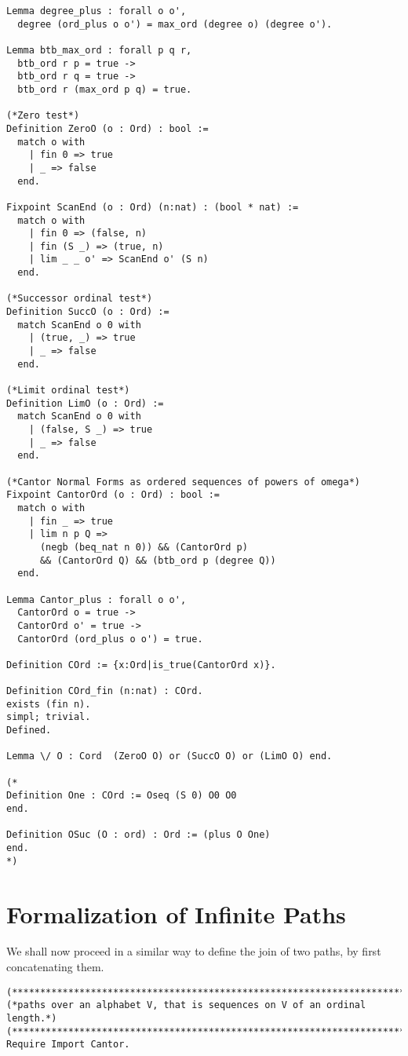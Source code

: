\documentclass{llncs}
\begin{document}
{\begin{verbatim}
Lemma degree_plus : forall o o',
  degree (ord_plus o o') = max_ord (degree o) (degree o').

Lemma btb_max_ord : forall p q r, 
  btb_ord r p = true ->
  btb_ord r q = true ->
  btb_ord r (max_ord p q) = true.

(*Zero test*)
Definition ZeroO (o : Ord) : bool :=
  match o with
    | fin 0 => true
    | _ => false
  end.

Fixpoint ScanEnd (o : Ord) (n:nat) : (bool * nat) :=
  match o with
    | fin 0 => (false, n)
    | fin (S _) => (true, n)
    | lim _ _ o' => ScanEnd o' (S n)
  end.

(*Successor ordinal test*)
Definition SuccO (o : Ord) := 
  match ScanEnd o 0 with
    | (true, _) => true
    | _ => false
  end.

(*Limit ordinal test*)
Definition LimO (o : Ord) :=
  match ScanEnd o 0 with
    | (false, S _) => true
    | _ => false
  end.

(*Cantor Normal Forms as ordered sequences of powers of omega*)
Fixpoint CantorOrd (o : Ord) : bool :=
  match o with
    | fin _ => true
    | lim n p Q => 
      (negb (beq_nat n 0)) && (CantorOrd p)
      && (CantorOrd Q) && (btb_ord p (degree Q))
  end.

Lemma Cantor_plus : forall o o',
  CantorOrd o = true ->
  CantorOrd o' = true ->
  CantorOrd (ord_plus o o') = true.

Definition COrd := {x:Ord|is_true(CantorOrd x)}.

Definition COrd_fin (n:nat) : COrd.
exists (fin n).
simpl; trivial.
Defined.

Lemma \/ O : Cord  (ZeroO O) or (SuccO O) or (LimO O) end.

(*
Definition One : COrd := Oseq (S 0) O0 O0 
end.

Definition OSuc (O : ord) : Ord := (plus O One) 
end.
*)
\end{verbatim}


\section{Formalization of Infinite Paths}

We shall now proceed in a similar way to define the join of two paths,
by first concatenating them.

\begin{verbatim}
(************************************************************************)
(*paths over an alphabet V, that is sequences on V of an ordinal length.*)
(************************************************************************)
Require Import Cantor.



\end{verbatim}}
\end{document}
